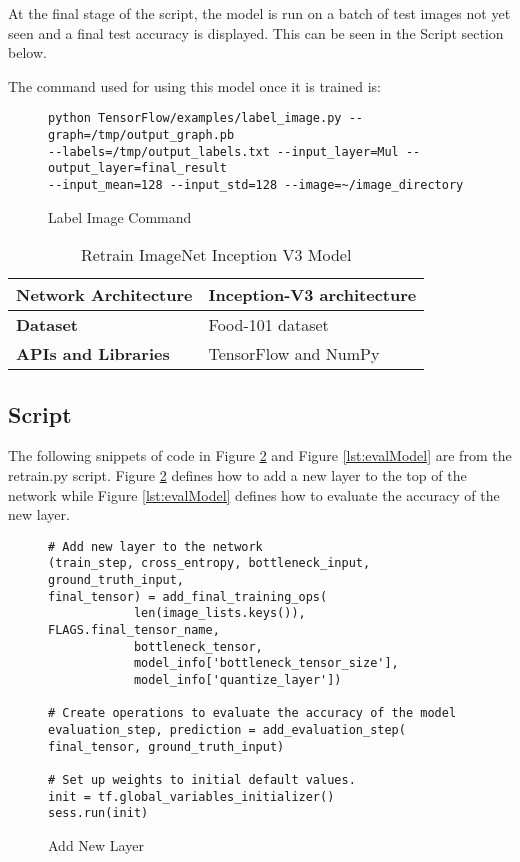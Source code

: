 At the final stage of the script, the model is run on a batch of test images not
yet seen and a final test accuracy is displayed. This can be seen in the Script
section below.

The command used for using this model once it is trained is:
\begin{figure}
\caption{Label Image Command}
\label{lst:labelImage}
\begin{lstlisting}[style=Command]
python TensorFlow/examples/label_image.py --graph=/tmp/output_graph.pb
--labels=/tmp/output_labels.txt --input_layer=Mul --output_layer=final_result
--input_mean=128 --input_std=128 --image=~/image_directory
\end{lstlisting}
\end{figure}

\begin{table}[h]
\centering
\caption{Retrain ImageNet Inception V3 Model}
\label{my-label}
\begin{tabular}{|l|p{8cm}|}
\hline
\textbf{Network Architecture} & Inception-V3 architecture \parencite{inception}            \\ \hline
\textbf{Dataset}              & Food-101 dataset \\ \hline
\textbf{APIs and Libraries}   & TensorFlow and NumPy                                                        \\ \hline
\end{tabular}
\end{table}

\tocless\subsection{Script}
The following snippets of code in Figure \ref{lst:addNewLayer} and Figure \ref{lst:evalModel} are from the retrain.py script.
Figure \ref{lst:addNewLayer} defines how to add a new layer to the top of the network while Figure \ref{lst:evalModel} defines how to evaluate the accuracy of the new layer. 

\begin{figure}
\caption{Add New Layer \parencite{retrainInception}}
\label{lst:addNewLayer}
\begin{lstlisting}[style=Python]
# Add new layer to the network
(train_step, cross_entropy, bottleneck_input, ground_truth_input,
final_tensor) = add_final_training_ops(
            len(image_lists.keys()), FLAGS.final_tensor_name,
            bottleneck_tensor,
            model_info['bottleneck_tensor_size'],
            model_info['quantize_layer'])
 
# Create operations to evaluate the accuracy of the model
evaluation_step, prediction = add_evaluation_step(
final_tensor, ground_truth_input)
 
# Set up weights to initial default values.
init = tf.global_variables_initializer()
sess.run(init)
\end{lstlisting}
\end{figure}

